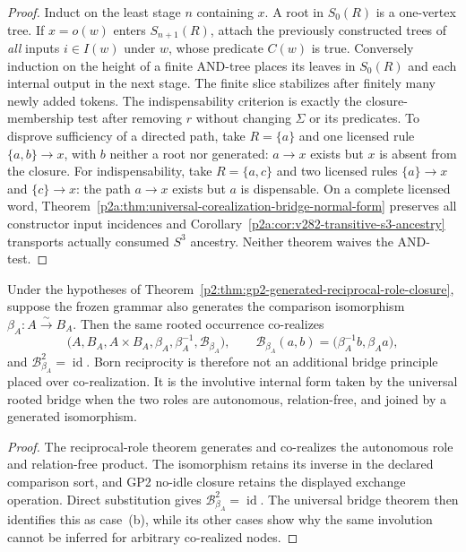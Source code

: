\documentclass[12pt,a4paper]{article}
\begin{document}
\begin{proof}
Induct on the least stage $n$ containing $x$.  A root in $S_0(R)$
is a one-vertex tree.  If $x=o(w)$ enters $S_{n+1}(R)$, attach the
previously constructed trees of \emph{all} inputs $i\in I(w)$ under
$w$, whose predicate $C(w)$ is true.  Conversely induction on the
height of a finite AND-tree places its leaves in $S_0(R)$ and each
internal output in the next stage.  The finite slice stabilizes after
finitely many newly added tokens.  The indispensability criterion is
exactly the closure-membership test after removing $r$ without changing
$\Sigma$ or its predicates.  To disprove sufficiency of a directed
path, take $R=\{a\}$ and one licensed rule $\{a,b\}\to x$, with
$b$ neither a root nor generated: $a\to x$ exists but $x$ is absent
from the closure.  For indispensability, take $R=\{a,c\}$ and two
licensed rules $\{a\}\to x$ and $\{c\}\to x$: the path $a\to x$
exists but $a$ is dispensable.  On a complete licensed word,
Theorem~\ref{p2a:thm:universal-corealization-bridge-normal-form}
preserves all constructor input incidences and
Corollary~\ref{p2a:cor:v282-transitive-s3-ancestry} transports
actually consumed $S^3$ ancestry.  Neither theorem waives the AND-test.
\end{proof}

\begin{corollary}
\label{p2a:cor:born-invertible-corealization}
Under the hypotheses of
Theorem~\ref{p2:thm:gp2-generated-reciprocal-role-closure}, suppose the frozen
grammar also generates the comparison isomorphism
\(\beta_A:A\overset{\sim}{\to}B_A\).  Then the same rooted occurrence
co-realizes
\[
 \bigl(A,B_A,A\times B_A,\beta_A,\beta_A^{-1},
       \mathcal B_{\beta_A}\bigr),
 \qquad
 \mathcal B_{\beta_A}(a,b)
 =\bigl(\beta_A^{-1}b,\beta_Aa\bigr),
\]
and \(\mathcal B_{\beta_A}^2=\operatorname{id}\).  Born reciprocity is
therefore not an additional bridge principle placed over co-realization.  It
is the involutive internal form taken by the universal rooted bridge when the
two roles are autonomous, relation-free, and joined by a generated
isomorphism.
\end{corollary}

\begin{proof}
The reciprocal-role theorem generates and co-realizes the autonomous role and
relation-free product.  The isomorphism retains its inverse in the declared
comparison sort, and GP2 no-idle closure retains the displayed exchange
operation.  Direct substitution gives
\(\mathcal B_{\beta_A}^2=\operatorname{id}\).  The universal bridge theorem
then identifies this as case~(b), while its other cases show why the same
involution cannot be inferred for arbitrary co-realized nodes.
\end{proof}
\end{document}
